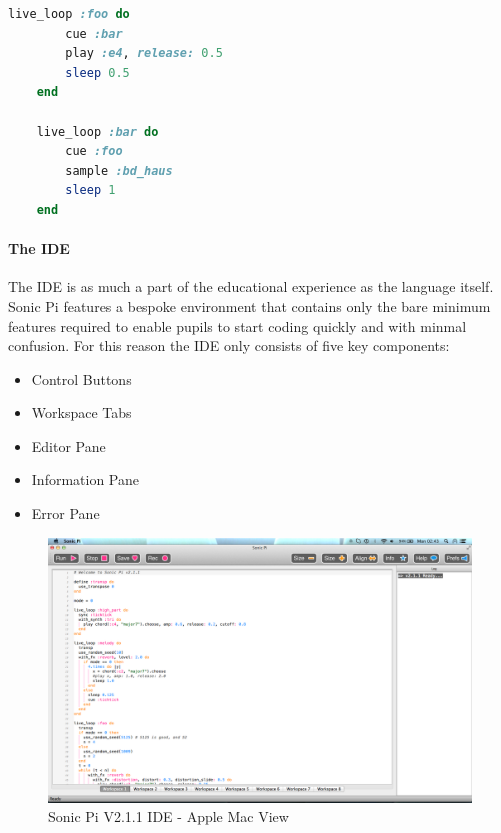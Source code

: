 \documentclass[11pt]{scrartcl}
\begin{document}
\begin{minipage}{\textwidth}
	\begin{lstlisting}[language = ruby]
	live_loop :foo do
	    cue :bar
	    play :e4, release: 0.5
	    sleep 0.5
	end

	live_loop :bar do
	    cue :foo
	    sample :bd_haus
	    sleep 1
	end
	\end{lstlisting}
\end{minipage}

\paragraph{The IDE}
The IDE is as much a part of the educational experience as the language 
itself. Sonic Pi features a bespoke environment that contains only the bare 
minimum features required to enable pupils to start coding quickly and with 
minmal confusion. For this reason the IDE only consists of five key components:

\begin{itemize}
	\item Control Buttons
	\item Workspace Tabs
	\item Editor Pane
	\item Information Pane
	\item Error Pane
\end{itemize}

\begin{figure}[t]
	\centering
	\includegraphics[width=\textwidth]{images/sonic-ide.png}
	\caption{Sonic Pi V2.1.1 IDE - Apple Mac View}
\end{figure}
\end{document}
